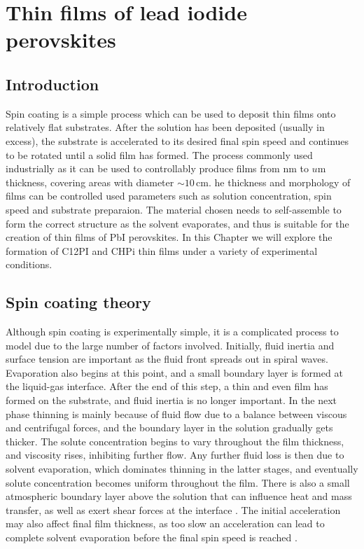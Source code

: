 
\chapter{Thin films of lead iodide perovskites}

\graphicspath{{Chapter4/Figures/}}

\section{Introduction}
Spin coating is a simple process which can be used to deposit thin films onto relatively flat substrates. After the solution has been deposited (usually in excess), the substrate is accelerated to its desired final spin speed and continues to be rotated until a solid film has formed. The process commonly used industrially as it can be used to controllably produce films from nm to $u$m thickness, covering areas with diameter $\sim10$\,cm. he thickness and morphology of films can be controlled used parameters such as solution concentration, spin speed and substrate preparaion. The material chosen needs to self-assemble to form the correct structure as the solvent evaporates, and thus is suitable for the creation of thin films of PbI perovskites. In this Chapter we will explore the formation of C12PI and CHPi thin films under a variety of experimental conditions.

\section{Spin coating theory}
Although spin coating is experimentally simple, it is a complicated process to model due to the large number of factors involved. Initially, fluid inertia and surface tension are important as the fluid front spreads out in spiral waves. Evaporation also begins at this point, and a small boundary layer is formed at the liquid-gas interface. After the end of this step, a thin and even film has formed on the substrate, and fluid inertia is no longer important. In the next phase thinning is mainly because of fluid flow due to a balance between viscous and centrifugal forces, and the boundary layer in the solution gradually gets thicker. The solute concentration begins to vary throughout the film thickness, and viscosity rises, inhibiting further flow. Any further fluid loss is then due to solvent evaporation, which dominates thinning in the latter stages, and eventually solute concentration becomes uniform throughout the film. There is also a small atmospheric boundary layer above the solution that can influence heat and mass transfer, as well as exert shear forces at the interface \cite{Meyerhofer1978, VanHardeveld1995, Lawrence1988}. The initial acceleration may also affect final film thickness, as too slow an acceleration can lead to complete solvent evaporation before the final spin speed is reached \cite{Birnie2005}.

